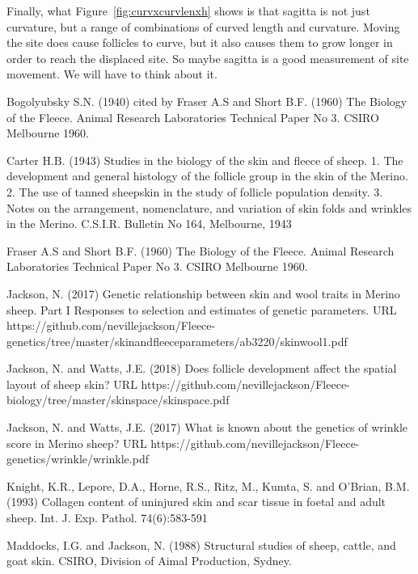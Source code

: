 \documentclass[titlepage]{article}  %
\begin{document}
Finally, what Figure~\ref{fig:curvxcurvlenxh} shows is that sagitta is not just curvature, but a range of combinations of curved length and curvature. Moving the site does cause follicles to curve, but it also causes them to grow longer in order to reach the displaced site. So maybe sagitta is a good measurement of site movement. We will have to think about it.


\clearpage
\begin{thebibliography}{99}

 Bogolyubsky S.N. (1940) cited by Fraser A.S and Short B.F. (1960) The Biology of the Fleece. Animal Research Laboratories Technical Paper No 3. CSIRO Melbourne 1960.


Carter H.B. (1943) Studies in the biology of the skin and fleece of sheep. 1. The development and general histology of the follicle group in the skin of the Merino. 2. The use of tanned sheepskin in the study of follicle population density. 3. Notes on the arrangement, nomenclature, and variation of skin folds and wrinkles in the Merino. C.S.I.R. Bulletin No 164, Melbourne, 1943

Fraser A.S and Short B.F. (1960) The Biology of the Fleece. Animal Research Laboratories Technical Paper No 3. CSIRO Melbourne 1960.


Jackson, N. (2017) Genetic relationship between skin and wool traits in Merino sheep. Part I Responses to selection and estimates of genetic parameters. URL https://github.com/nevillejackson/Fleece-genetics/tree/master/skinandfleeceparameters/ab3220/skinwool1.pdf

Jackson, N. and Watts, J.E. (2018) Does follicle development affect the spatial layout of sheep skin? URL https://github.com/nevillejackson/Fleece-biology/tree/master/skinspace/skinspace.pdf


Jackson, N. and Watts, J.E. (2017) What is known about the genetics of wrinkle score in Merino sheep? URL https://github.com/nevillejackson/Fleece-genetics/wrinkle/wrinkle.pdf

Knight, K.R., Lepore, D.A., Horne, R.S., Ritz, M., Kumta, S. and O'Brian, B.M. (1993) Collagen content of uninjured skin and scar tissue in foetal and adult sheep. Int. J. Exp. Pathol. 74(6):583-591

Maddocks, I.G. and Jackson, N. (1988) Structural studies of sheep, cattle, and goat skin. CSIRO, Division of Aimal Production, Sydney.


\end{thebibliography}
\end{document}
